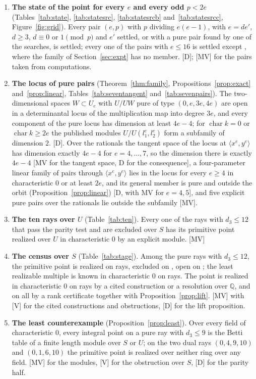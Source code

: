 \documentclass[11pt]{article}
\theoremstyle{definition}
\theoremstyle{remark}
\newcommand{\Q}{\mathbb{Q}}
\newcommand{\ch}{\operatorname{char}}
\begin{document}
\begin{enumerate}
\item \textbf{The state of the point for every $e$ and every odd $p<2e$} (Tables~\ref{tab:state}, \ref{tab:statesrc}, \ref{tab:statesrcb} and~\ref{tab:statesrcc}, Figure~\ref{fig:grid}). Every pair $(e,p)$ with $p$ dividing $e(e-1)$, with $e=de'$, $d\ge3$, $d\equiv0$ or $1\pmod p$ and $e'$ settled, or with a pure pair found by one of the searches, is settled; every one of the \ngridCells{} pairs with $e\le16$ is settled except \ngridOpenListSixteen{}, where the family of Section~\ref{sec:expt} has no member. [D]; [MV] for the pairs taken from computations.
\item \textbf{The locus of pure pairs} (Theorem~\ref{thm:family}, Propositions~\ref{prop:exact} and~\ref{prop:linear}, Tables~\ref{tab:seventangent} and~\ref{tab:sevenpairs}). The two-dimensional spaces $W\subset U_e$ with $U/UW$ pure of type $(0,e,3e,4e)$ are open in a determinantal locus of the multiplication map into degree $3e$, and every component of the pure locus has dimension at least $4e-4$; for $\ch k=0$ or $\ch k\ge2e$ the published modules $U/U(l_1^e,l_2^e)$ form a subfamily of dimension $2$. [D]. Over the rationals the tangent space of the locus at $\langle x^e,y^e\rangle$ has dimension exactly $4e-4$ for $e=4,\dots,7$, so the dimension there is exactly $4e-4$ [MV for the tangent space, D for the consequence], a four-parameter linear family of pairs through $\langle x^e,y^e\rangle$ lies in the locus for every $e\ge4$ in characteristic $0$ or at least $2e$, and its general member is pure and outside the orbit (Proposition~\ref{prop:linear}) [D, with MV for $e=4,5$], and five explicit pure pairs over the rationals lie outside the subfamily [MV].
\item \textbf{The ten rays over $U$} (Table~\ref{tab:ten}). Every one of the \ntenRays{} rays with $d_3\le12$ that pass the parity test and are excluded over $S$ has its primitive point realized over $U$ in characteristic $0$ by an explicit module. [MV]
\item \textbf{The census over $S$} (Table~\ref{tab:stage}). Among the \nrays{} pure rays with $d_3\le12$, the primitive point is realized on \nrealized{} rays, excluded on \nexcluded{}, open on \nopen{}; the least realizable multiple is known in characteristic $0$ on \ncDetermined{} rays. The point is realized in characteristic $0$ on \nrealizedZero{} rays by a cited construction or a resolution over $\Q$, and on all \nrealized{} by a rank certificate together with Proposition~\ref{prop:lift}. [MV] with [V] for the cited constructions and obstructions, [D] for the lift proposition.
\item \textbf{The least counterexample} (Proposition~\ref{prop:least}). Over every field of characteristic $0$, every integral point on a pure ray with $d_3\le9$ is the Betti table of a finite length module over $S$ or $U$; on the two dual rays $(0,4,9,10)$ and $(0,1,6,10)$ the primitive point is realized over neither ring over any field. [MV] for the modules, [V] for the obstruction over $S$, [D] for the parity half.
\end{enumerate}
\end{document}
